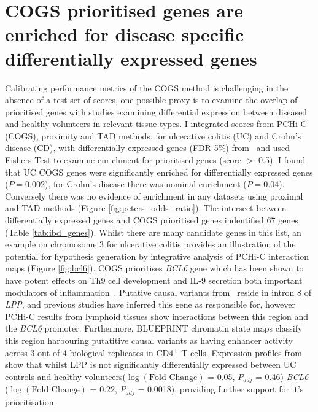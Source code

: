 \documentclass[a4paper,11pt]{report}
\begin{document}
\section{COGS prioritised genes are enriched for disease specific differentially expressed genes} 
Calibrating performance metrics of the COGS method is challenging in the absence of a test set of scores, one possible proxy is to examine the overlap of prioritised genes with studies examining differential expression between diseased and healthy volunteers in relevant tissue types. I integrated scores from PCHi-C (COGS), proximity and TAD methods, for ulcerative colitis (UC) and Crohn's disease (CD), with differentially expressed genes (FDR 5\%) from~\citet{PetersLyonsLeeEtAl2016} and used Fishers Test to examine enrichment for prioritised genes (score $>$ 0.5). I found that UC COGS genes were significantly enriched for differentially expressed genes ($P = 0.002$), for Crohn's disease there was nominal enrichment ($P = 0.04$). Conversely there was no evidence of enrichment in any datasets using proximal and TAD methods (Figure \ref{fig:peters_odds_ratio}). The intersect between differentially expressed genes and COGS prioritised genes indentified 67 genes (Table \ref{tab:ibd_genes}). Whilst there are many candidate genes in this list, an example on chromosome 3 for ulcerative colitis provides an illustration of the potential for hypothesis generation by integrative analysis of PCHi-C interaction maps (Figure \ref{fig:bcl6}). COGS prioritises \textit{BCL6} gene which has been shown to have potent effects on Th9 cell development and IL-9 secretion both important modulators of inflammation~\citep{BassilOrentOlahEtAl2014}. Putative causal variants from~\citet{Anderson2011-ch} reside in intron 8 of \textit{LPP}, and previous studies have inferred this gene as responsible for, however PCHi-C results from lymphoid tissues show interactions between this region and the \textit{BCL6} promoter. Furthermore, BLUEPRINT chromatin state maps classify this region harbouring putatitive causal variants as having enhancer activity across 3 out of 4 biological replicates in CD4$^+$ T cells. Expression profiles from~\citet{PetersLyonsLeeEtAl2016} show that whilst LPP is not significantly differentially expressed between UC controls and healthy volunteers($\log(\text{Fold Change})$ = 0.05, $P_{adj}$ =  0.46) \textit{BCL6} ($\log(\text{Fold Change})$ = 0.22, $P_{adj}$ =  0.0018), providing further support for it's prioritisation.
\end{document}
